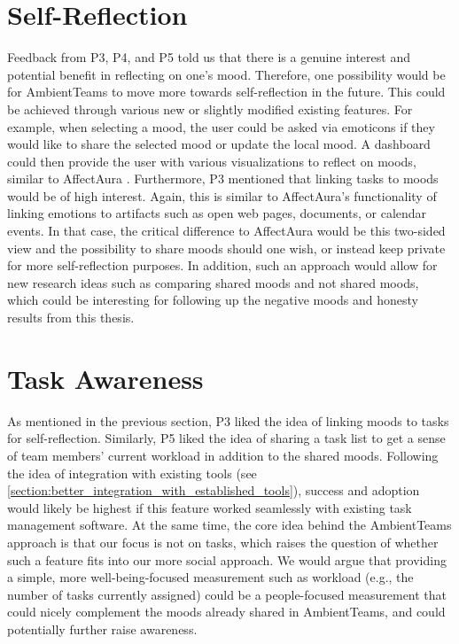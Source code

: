 \section{Self-Reflection}
Feedback from P3, P4, and P5 told us that there is a genuine interest and potential benefit in reflecting on one's mood. Therefore, one possibility would be for AmbientTeams to move more towards self-reflection in the future. This could be achieved through various new or slightly modified existing features. For example, when selecting a mood, the user could be asked via emoticons if they would like to share the selected mood or update the local mood. A dashboard could then provide the user with various visualizations to reflect on moods, similar to AffectAura \autocite{mcduff2012affectaura}. Furthermore, P3 mentioned that linking tasks to moods would be of high interest. Again, this is similar to AffectAura's functionality of linking emotions to artifacts such as open web pages, documents, or calendar events. In that case, the critical difference to AffectAura would be this two-sided view and the possibility to share moods should one wish, or instead keep private for more self-reflection purposes. In addition, such an approach would allow for new research ideas such as comparing shared moods and not shared moods, which could be interesting for following up the negative moods and honesty results from this thesis.

\section{Task Awareness}
As mentioned in the previous section, P3 liked the idea of linking moods to tasks for self-reflection. Similarly, P5 liked the idea of sharing a task list to get a sense of team members' current workload in addition to the shared moods. Following the idea of integration with existing tools (see \autoref{section:better_integration_with_established_tools}), success and adoption would likely be highest if this feature worked seamlessly with existing task management software. At the same time, the core idea behind the AmbientTeams approach is that our focus is not on tasks, which raises the question of whether such a feature fits into our more social approach. We would argue that providing a simple, more well-being-focused measurement such as workload (e.g., the number of tasks currently assigned) could be a people-focused measurement that could nicely complement the moods already shared in AmbientTeams, and could potentially further raise awareness.

